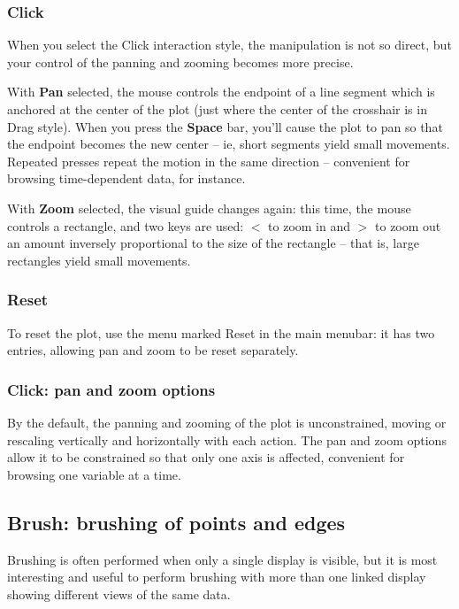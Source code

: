 \documentclass[11pt]{article}
\begin{document}
\subsubsection{Click}

When you select the Click interaction style, the manipulation is
not so direct, but your control of the panning and zooming becomes
more precise.

With {\bf Pan} selected, the mouse controls the endpoint of a line
segment which is anchored at the center of the plot (just where the
center of the crosshair is in Drag style).  When you press the {\bf
Space} bar, you'll cause the plot to pan so that the endpoint becomes
the new center -- ie, short segments yield small movements.  Repeated
presses repeat the motion in the same direction -- convenient for
browsing time-dependent data, for instance.

With {\bf Zoom} selected, the visual guide changes again: this time,
the mouse controls a rectangle, and two keys are used: {\boldmath $<$}
to zoom in and {\boldmath $>$} to zoom out an amount inversely
proportional to the size of the rectangle -- that is, large rectangles
yield small movements.

\subsubsection{Reset}

To reset the plot, use the menu marked Reset in the main menubar:
it has two entries, allowing pan and zoom to be reset separately.

\subsubsection{Click: pan and zoom options}

By the default, the panning and zooming of the plot is unconstrained,
moving or rescaling vertically and horizontally with each action.
The pan and zoom options allow it to be constrained so that only
one axis is affected, convenient for browsing one variable at a time.

\subsection{Brush: brushing of points and edges}
\label{slbl:Brush}

Brushing is often performed when only a single display is visible,
but it is most interesting and useful to perform brushing with more
than one linked display showing different views of the same data.  
\end{document}
